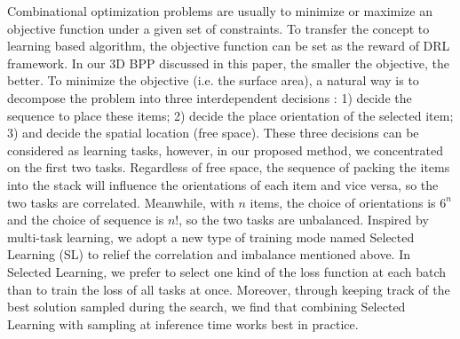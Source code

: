 
Combinational optimization problems are usually to minimize or maximize an objective function under a given set of constraints. To transfer the concept to learning based algorithm, the objective function can be set as the reward of DRL framework. In our 3D BPP discussed in this paper, the smaller the objective, the better. To minimize the objective (i.e. the surface area), a natural way is to decompose the problem into three interdependent decisions \cite{gonccalves2013biased,li2014genetic}: 1) decide the sequence to place these items; 2) decide the place orientation of the selected item; 3) and decide the spatial location (free space). These three decisions can be considered as learning tasks, however, in our proposed method, we concentrated on the first two tasks. Regardless of free space, the sequence of packing the items into the stack will influence the orientations of each item and vice versa, so the two tasks are correlated. Meanwhile, with $n$ items, the choice of orientations is $6^n$ and the choice of sequence is $n!$, so the two tasks are unbalanced. Inspired by multi-task learning, %
we adopt a new type of training mode named 
Selected Learning (SL) to relief the correlation and imbalance mentioned above. In Selected Learning, we prefer to select one kind of the loss function at each batch than to train the loss of all tasks at once. Moreover, through keeping track of the best solution sampled during the search, we find that combining Selected Learning with sampling at inference time works best in practice.

